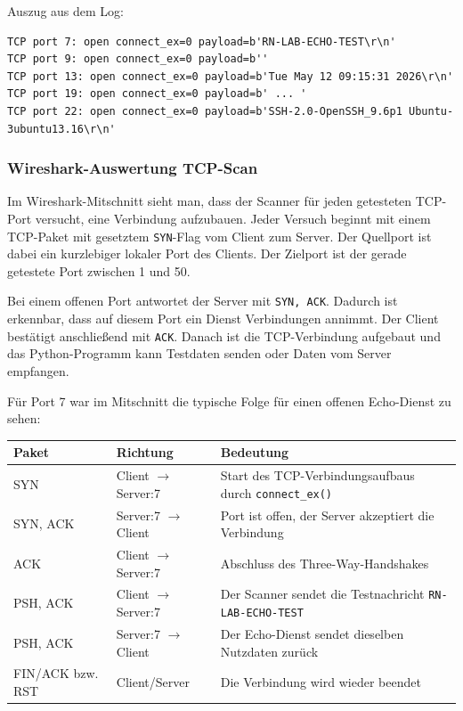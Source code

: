 \documentclass{kdiartcl}
\begin{document}
Auszug aus dem Log:

\begin{verbatim}
TCP port 7: open connect_ex=0 payload=b'RN-LAB-ECHO-TEST\r\n'
TCP port 9: open connect_ex=0 payload=b''
TCP port 13: open connect_ex=0 payload=b'Tue May 12 09:15:31 2026\r\n'
TCP port 19: open connect_ex=0 payload=b' ... '
TCP port 22: open connect_ex=0 payload=b'SSH-2.0-OpenSSH_9.6p1 Ubuntu-3ubuntu13.16\r\n'
\end{verbatim}

\subsubsection{Wireshark-Auswertung TCP-Scan}

Im Wireshark-Mitschnitt sieht man, dass der Scanner für jeden getesteten TCP-Port versucht, eine Verbindung aufzubauen. Jeder Versuch beginnt mit einem TCP-Paket mit gesetztem \texttt{SYN}-Flag vom Client zum Server. Der Quellport ist dabei ein kurzlebiger lokaler Port des Clients. Der Zielport ist der gerade getestete Port zwischen 1 und 50.

Bei einem offenen Port antwortet der Server mit \texttt{SYN, ACK}. Dadurch ist erkennbar, dass auf diesem Port ein Dienst Verbindungen annimmt. Der Client bestätigt anschließend mit \texttt{ACK}. Danach ist die TCP-Verbindung aufgebaut und das Python-Programm kann Testdaten senden oder Daten vom Server empfangen.

Für Port 7 war im Mitschnitt die typische Folge für einen offenen Echo-Dienst zu sehen:

\begin{center}
\small
\begin{tabularx}{\textwidth}{|l|l|Y|}
\hline
\textbf{Paket} & \textbf{Richtung} & \textbf{Bedeutung} \\
\hline
SYN & Client $\rightarrow$ Server:7 & Start des TCP-Verbindungsaufbaus durch \texttt{connect\_ex()} \\
\hline
SYN, ACK & Server:7 $\rightarrow$ Client & Port ist offen, der Server akzeptiert die Verbindung \\
\hline
ACK & Client $\rightarrow$ Server:7 & Abschluss des Three-Way-Handshakes \\
\hline
PSH, ACK & Client $\rightarrow$ Server:7 & Der Scanner sendet die Testnachricht \texttt{RN-LAB-ECHO-TEST} \\
\hline
PSH, ACK & Server:7 $\rightarrow$ Client & Der Echo-Dienst sendet dieselben Nutzdaten zurück \\
\hline
FIN/ACK bzw. RST & Client/Server & Die Verbindung wird wieder beendet \\
\hline
\end{tabularx}
\end{center}
\end{document}

